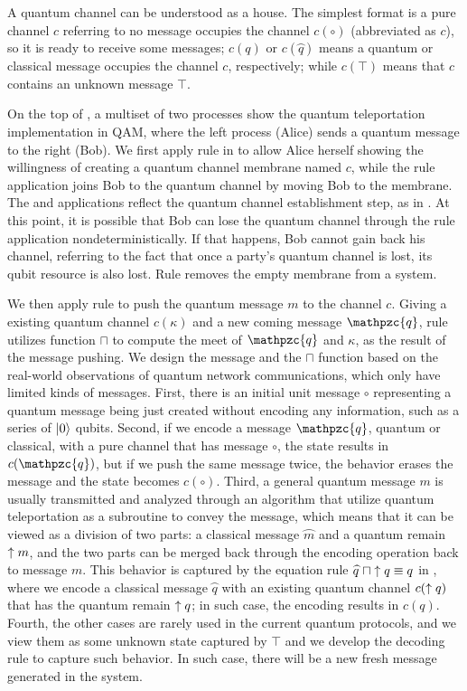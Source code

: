 A quantum channel can be understood as a house.
The simplest format is a pure channel $c$ referring to no message occupies the channel $c(\circ)$ (abbreviated as $c$), so it is ready to receive some messages;
$c(q)$ or $c(\wideparen{q})$ means a quantum or classical message occupies the channel $c$, respectively;
while $c(\top)$ means that $c$ contains an unknown message $\top$.

On the top of , a multiset of two processes show the quantum teleportation implementation in QAM,
where the left process (Alice) sends a quantum message to the right (Bob).
We first apply rule  in 
to allow Alice herself showing the willingness of creating a quantum channel membrane named $c$,
while the  rule application joins Bob to the quantum channel by moving Bob to the membrane.
The  and  applications reflect the quantum channel establishment step, as  in .
At this point, it is possible that Bob can lose the quantum channel through the  rule application nondeterministically.
If that happens, Bob cannot gain back his channel,
referring to the fact that once a party's quantum channel is lost, its qubit resource is also lost.
Rule  removes the empty membrane from a system.

We then apply rule  to push the quantum message $m$ to the channel $c$.
Giving a existing quantum channel $c(\kappa)$ and a new coming message $\mathpzc{q}$,
rule  utilizes function $\sqcap$
to compute the meet of $\mathpzc{q}$ and $\kappa$, as the result of the message pushing.
We design the message and the $\sqcap$ function based on the real-world observations of quantum network communications,
which only have limited kinds of messages. First, there is an initial unit message $\circ$ representing a quantum message being just created without encoding any information, such as a series of $\ket{0}$ qubits.
Second, if we encode a message $\mathpzc{q}$, quantum or classical, with a pure channel that has message $\circ$, the state results in $c(\mathpzc{q})$,
but if we push the same message twice, the behavior erases the message and the state becomes $c(\circ)$.
Third, a general quantum message $m$ is usually transmitted and analyzed through an algorithm that utilize quantum teleportation as a subroutine to convey the message, which means that it can be viewed as a division of two parts: a classical message $\wideparen{m}$ and a quantum remain $\uparrow m$, and the two parts can be merged back through the encoding operation back to message $m$.
This behavior is captured by the equation rule $\wideparen{q}\; \sqcap \up{q} \equiv q$ in ,
where we encode a classical message $\wideparen{q}$ with an existing quantum channel $c(\uparrow q)$ that has the quantum remain $\uparrow q$;
in such case, the encoding results in $c(q)$.
Fourth, the other cases are rarely used in the current quantum protocols, and we view them as some unknown state captured by $\top$ and we develop the decoding rule  to capture such behavior. In such case, there will be a new fresh message generated in the system.

